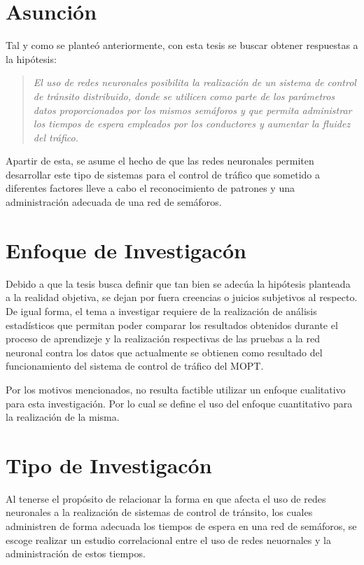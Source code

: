 \section{Asunci\'{o}n}

Tal y como se plante\'{o} anteriormente, con esta tesis se buscar obtener
respuestas a la hip\'{o}tesis:

\begin{quote}
	\textit{El uso de redes neuronales posibilita la realizaci\'{o}n de un sistema
de control de tr\'{a}nsito distribuido, donde se utilicen como parte de los par\'{a}metros datos
proporcionados por los mismos sem\'{a}foros y que permita administrar los tiempos de
espera empleados por los conductores y aumentar la fluidez del tr\'{a}fico.}
\end{quote}

	Apartir de esta, se asume el hecho de que las redes neuronales permiten
desarrollar este tipo de sistemas para el control de tr\'{a}fico que sometido a
diferentes factores lleve a cabo el reconocimiento de patrones y una
administraci\'{o}n adecuada de una red de sem\'{a}foros.

\section{Enfoque de Investigac\'{o}n}

	
	Debido a que la tesis busca definir que tan bien se adec\'{u}a la hip\'{o}tesis
planteada a la realidad objetiva, se dejan por fuera creencias o juicios
subjetivos al respecto. De igual forma, el tema a investigar requiere de la
realizaci\'{o}n de an\'{a}lisis estad\'{i}sticos que permitan poder comparar
los resultados obtenidos durante el proceso de aprendizeje y la realizaci\'{o}n
respectivas de las pruebas a la red neuronal contra los datos que actualmente
se obtienen como resultado del funcionamiento del sistema de control de
tr\'{a}fico del MOPT.
	
	Por los motivos mencionados, no resulta factible utilizar un enfoque
cualitativo para esta investigaci\'{o}n. Por lo cual se define el uso del
enfoque cuantitativo para la realizaci\'{o}n de la misma.

\section{Tipo de Investigac\'{o}n}


	Al tenerse el prop\'{o}sito de relacionar la forma en que afecta el uso de
redes neuronales a la realizaci\'{o}n de sistemas de control de tr\'{a}nsito,
los cuales administren de forma adecuada los tiempos de espera en una red
de sem\'{a}foros, se escoge realizar un estudio correlacional entre el uso de
redes neuornales y la administraci\'{o}n de estos tiempos.

